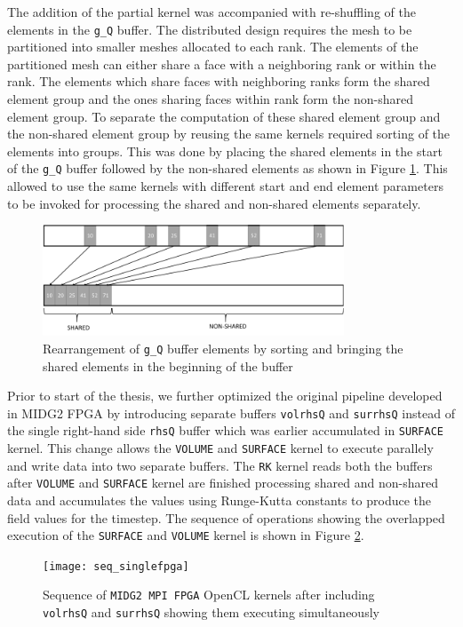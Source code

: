 The addition of the partial kernel was accompanied with re-shuffling of the elements in the \texttt{g\_Q}
buffer. The distributed design requires the mesh to be partitioned into smaller meshes allocated
to each rank. The elements of the partitioned mesh can either share a face with a neighboring
rank or within the rank. The elements which share faces with neighboring ranks form the shared
element group and the ones sharing faces within rank form the non-shared element group.
To separate the computation of these shared element group and the non-shared element group
by reusing the same kernels required sorting of the elements into groups. This was done by
placing the shared elements in the start of the \texttt{g\_Q} buffer followed by the non-shared
elements as shown in Figure \ref{fig:rearrange}. This allowed to use the same kernels with different
start and end element parameters to be invoked for processing the shared and non-shared elements separately.
\begin{figure}%
    \centering
    \includegraphics[width=0.8\textwidth]{images/rearrange}
    \caption{Rearrangement of \texttt{g\_Q} buffer elements by sorting and bringing the
    shared elements in the beginning of the buffer}
    \label{fig:rearrange}
\end{figure}

Prior to start of the thesis, we further optimized the original pipeline developed in MIDG2 FPGA
by introducing separate buffers \texttt{volrhsQ} and \texttt{surrhsQ} instead of the single
right-hand side \texttt{rhsQ} buffer which was earlier accumulated in \texttt{SURFACE} kernel.
This change allows the \texttt{VOLUME} and \texttt{SURFACE} kernel to execute parallely and write data into
two separate buffers. The \texttt{RK} kernel reads both the buffers after \texttt{VOLUME} and \texttt{SURFACE} kernel
are finished processing shared and non-shared data and accumulates the values using Runge-Kutta
constants to produce the field values for the timestep. The sequence of operations
showing the overlapped execution of the \texttt{SURFACE} and \texttt{VOLUME} kernel is shown in Figure \ref{fig:seq_singlefpga}.
\begin{figure}[ht]%
    \centering
    \texttt{[image: seq\_singlefpga]}
    \caption{Sequence of \texttt{MIDG2 MPI FPGA} OpenCL kernels after including \texttt{volrhsQ} and \texttt{surrhsQ}
    showing them executing simultaneously}
    \label{fig:seq_singlefpga}
\end{figure}

